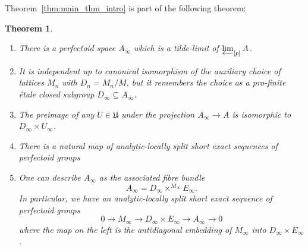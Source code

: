 \documentclass[10pt,oneside]{amsart}
\newtheorem{theorem}{Theorem}[section]
\theoremstyle{definition}
\begin{document}
Theorem~\ref{thm:main_thm_intro} is part of the following theorem:	
	\begin{theorem}\label{tilde-limit of tilde-limits of partial towers is tilde-limit of whole tower}
		\begin{enumerate}
		\item There is a perfectoid space  $A_\infty$ which is a tilde-limit of $\varprojlim_{[p]}A$.
		\item It is independent up to canonical isomorphism of the auxiliary choice of lattices $M_n$ with $D_n=M_n/M$, but it remembers the choice as a pro-finite \'etale closed subgroup $D_\infty \subseteq A_\infty$. 
		\item The preimage of any $U\in \mathfrak U$ under the projection $A_\infty \rightarrow A$ is isomorphic to $D_\infty \times U_\infty$. 
		
		\item 	There is a natural map of analytic-locally split short exact sequences of perfectoid groups		
		\begin{center}
		\end{center}
		\item One can describe $A_\infty$ as the associated fibre bundle
		\[A_\infty = D_\infty\times^{M_\infty}E_\infty.\]
		In particular, we have an analytic-locally split short exact sequence of perfectoid groups
		\[0\rightarrow M_\infty\rightarrow D_\infty \times E_\infty \rightarrow A_\infty\rightarrow 0\]
		where the map on the left is the antidiagonal embedding of $M_\infty$ into $D_\infty\times E_\infty$.
		\end{enumerate}
	\end{theorem}
\end{document}
